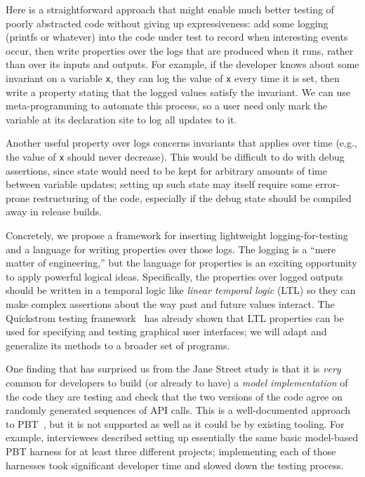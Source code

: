 Here is a straightforward approach that might enable much better testing
of poorly abstracted code without giving
up expressiveness: add some logging (printfs or whatever) into the
code under test to record when interesting events occur, then write
properties over the logs that are produced when it runs, rather than over its
inputs and outputs. For example, if the developer
knows about some invariant on a variable \lstinline{x}, they can log the
value of \lstinline{x} every time it is set, then write a property
stating that the logged
values satisfy the invariant.  We can use meta-programming to automate this
process, so a user need only mark the variable at its declaration site
to log all updates to it.

Another
useful property over logs concerns
invariants that applies over time (e.g., the value of \lstinline{x} should
never decrease).
This would be difficult to do with debug assertions, since state would need to
be kept for arbitrary amounts of time between variable updates; setting up such
state may itself require some error-prone restructuring of the code, especially
if the debug state should be compiled away in release builds.

Concretely, we propose a framework for inserting lightweight
logging-for-testing and a
language for writing properties over those logs. The logging is a
``mere matter
of engineering,'' but the language for properties
is an exciting opportunity to
apply powerful logical ideas. Specifically, the properties over logged outputs
should be written in a temporal logic like {\em linear temporal logic} (LTL) so
they can make complex assertions about the way past and future values interact.
The Quickstrom testing framework~\cite{oconnor_quickstrom_2022} has already shown that
LTL properties can be used for specifying and testing graphical
user interfaces; we will adapt and generalize its methods to a
broader set of programs.

One finding that has surprised us from the Jane Street study
is that it is {\em very} common for developers to
build (or already to have) a {\em model implementation} of the code
they are testing and
check that the two versions of the code agree on randomly generated
sequences of API calls.
This is a well-documented approach to PBT~\cite{hughes_experiences_2016}, but it
is not supported as well as it could be by existing tooling. For example,
interviewees described setting up essentially the same basic
model-based PBT harness for at least three different projects; implementing each
of those harnesses took significant developer time and slowed down the testing
process.  

